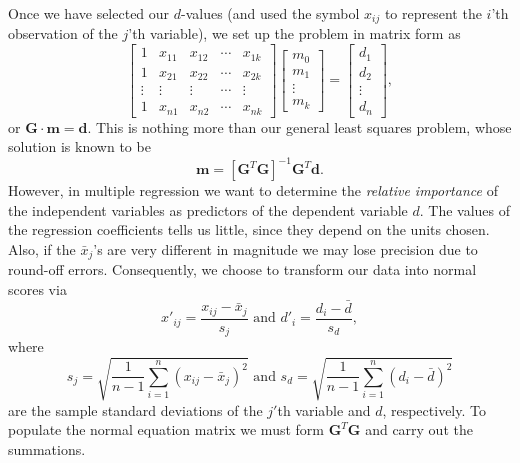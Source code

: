 Once we have selected our $d$-values (and used the symbol $x_{ij}$ to represent the $i$'th observation
of the $j$'th variable), we set up the problem in matrix form as
\begin{equation}
\left [ \begin{array}{ccccc}
1 & x_{11} & x_{12} &  \cdots & x_{1k} \\
1 & x_{21} & x_{22} &  \cdots & x_{2k} \\
\vdots & \vdots & \vdots & \cdots & \vdots \\
1 & x_{n1} & x_{n2} & \cdots & x_{nk} \end{array}\right ]
\left [ \begin{array}{c}
m_0\\ m_1\\ \vdots \\ m_k \end{array} \right ]  = 
\left [ \begin{array}{c}
d_1 \\ d_2\\ \vdots \\  d_n
\end{array} \right ],
\end{equation}	 
or $\mathbf{G\cdot m = d}$.  This is nothing more than our general least squares problem, whose solution is known to be 
\begin{equation}
\mathbf{m} = [ \mathbf{G}^T\mathbf{G} ]^{-1} \mathbf{G}^T\mathbf{d}.
\end{equation}	 	
However, in multiple regression we want to determine the \emph{relative importance} of the independent variables 
as predictors of the dependent variable $d$.  The values of the regression coefficients tells us little, 
since they depend on the units chosen.  Also, if the $\bar{x}_j$'s are very different in magnitude we may lose 
precision due to round-off errors.  Consequently, we choose to transform our data into normal scores via
\begin{equation}
x'_{ij} = \frac{x_{ij} - \bar{x}_j}{s_j} \mbox{ and } d'_i = \frac{d_i - \bar{d}}{s_d},
\end{equation}
where
\begin{equation}
s_j = \sqrt{ \frac{1}{n-1} \sum ^n _{i=1} (x_{ij} - \bar{x}_j)^2} \mbox{ and } s_d = \sqrt{ \frac{1}{n-1} \sum ^n _{i=1} (d_i - \bar{d})^2}
\end{equation}	 
are the sample standard deviations of the $j'$th variable and $d$, respectively.  To populate the normal equation matrix we must form 
$\mathbf{G}^T\mathbf{G}$ and carry out the summations.  
